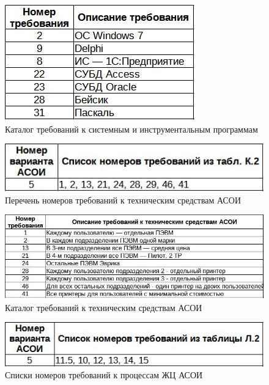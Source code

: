 \documentclass[12pt, a4paper, simple]{eskdtext}
\begin{document}
    \begin{figure}[ph!]
        \centering
        \includegraphics[]
            {_docs/ТаблицаЕ2КаталогТребованийКСистемнымИИнструментальнымПрограммам.jpg}
        \caption{Каталог требований к системным и инструментальным программам}
    \end{figure}

    \begin{figure}[ph!]
        \centering
        \includegraphics[]
            {_docs/ТаблицаК1ПереченьНомеровТребованийКТехническимСредствамАСОИ.jpg}
        \caption{Перечень номеров требований к техническим средствам АСОИ}
    \end{figure}

    \begin{figure}[ph!]
        \centering
        \includegraphics[]
            {_docs/ТаблицаK2КаталогТребованийКТехническимСредствамАСОИ.jpg}
        \caption{Каталог требований к техническим средствам АСОИ}
    \end{figure}

    \begin{figure}[ph!]
        \centering
        \includegraphics[]
            {_docs/ТаблицаЛ1СпискиНомеровТребованийКПроцессамЖЦАСОИ.jpg}
        \caption{Списки номеров требований к процессам ЖЦ АСОИ}
    \end{figure}
\end{document}

